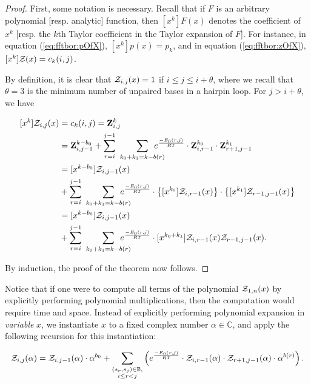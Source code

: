 \begin{proof}
First, some notation is necessary.
Recall that if $F$ is an arbitrary
polynomial [resp. analytic] function, then $[x^k] F(x)$
denotes the coefficient of $x^k$ [resp. the $k$th Taylor coefficient in the
Taylor expansion of $F$]. For instance, in equation (\ref{eq:fftbor:pOfX}),
$[x^k]p(x) = p_k$, and in equation (\ref{eq:fftbor:zOfX}),
$[x^k]{\mathcal Z}_{}(x) = c_k(i,j)$.

By definition, it is clear that ${\mathcal Z}_{i,j}(x)=1$ if $i \leq j \leq i + \theta$,
where we recall that $\theta = 3$ is the minimum number of unpaired bases in
a hairpin loop. For $j > i + \theta$, we have

\begin{align}
\begin{split}
[x^k] \emZ{i,j} &= c_k(i,j) = \bfZ{k}{i,j} \\
&= \bfZ{k-b_0}{i,j-1} +
\sum_{r=i}^{j-1}\hspace{2.25em} \sum_{\mathclap{k_0+k_1=k-b(r)}}\enspace
\boltzNuss{r,j} \cdot \bfZ{k_0}{i,r-1} \cdot \bfZ{k_1}{r+1,j-1} \\
&= [x^{k-b_0}] \emZ{i,j-1} \\
&+ \sum_{r=i}^{j-1}\hspace{2.25em} \sum_{\mathclap{k_0+k_1=k-b(r)}}\enspace
\boltzNuss{r,j} \cdot \left\{ [x^{k_0}] \emZ{i,r-1} \right\} \cdot
\left\{ [x^{k_1}] \emZ{r-1,j-1} \right\} \\
&= [x^{k-b_0}] \emZ{i,j-1} \\
&+ \sum_{r=i}^{j-1}\hspace{2.25em} \sum_{\mathclap{k_0+k_1=k-b(r)}}\enspace
\boltzNuss{r,j} \cdot [x^{k_0+k_1}] \emZ{i,r-1} \emZ{r-1,j-1} .\\
\end{split}
\end{align}

By induction, the proof of the theorem now follows.
\end{proof}

Notice that if one were to compute all terms of the polynomial ${\mathcal Z}_{1,n}(x)$
by explicitly performing polynomial multiplications,
then the computation would require  time and  space.
Instead of explicitly performing polynomial expansion in {\em variable} $x$,
we instantiate $x$ to a fixed complex number $\alpha \in \mathbb{C}$, and apply
the following recursion for this instantiation:

\begin{align}
\label{eq:fftbor:fftborNussPolyAlpha}
\emZof{i,j}{\alpha} = \emZof{i,j-1}{\alpha} \cdot \alpha^{b_0} +
\sum_{\substack{(s_r,s_j) \in \bpSet, \\ i \le r<j}}
\left(
\boltzNuss{r,j} \cdot
\emZof{i,r-1}{\alpha} \cdot \emZof{r+1,j-1}{\alpha} \cdot \alpha^{b(r)}
\right).
\end{align}

